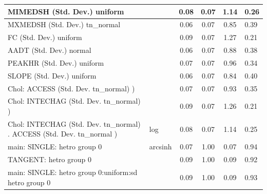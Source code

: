 \begin{table}
\begin{center}
\begin{tabular}{|l|l|c|c|c|l|}
			\hline
			MIMEDSH (Std. Dev.) uniform &  & 0.08 & 0.07 & 1.14 & 0.26 \\
			\hline
			MXMEDSH (Std. Dev.) tn_normal &  & 0.06 & 0.07 & 0.85 & 0.39 \\
			\hline
			FC (Std. Dev.) uniform &  & 0.09 & 0.07 & 1.27 & 0.21 \\
			\hline
			AADT (Std. Dev.) normal &  & 0.06 & 0.07 & 0.88 & 0.38 \\
			\hline
			PEAKHR (Std. Dev.) uniform &  & 0.07 & 0.07 & 0.96 & 0.34 \\
			\hline
			SLOPE (Std. Dev.) uniform &  & 0.06 & 0.07 & 0.84 & 0.40 \\
			\hline
			 Chol: ACCESS (Std. Dev. tn_normal) ) &  & 0.07 & 0.07 & 0.93 & 0.35 \\
			\hline
			 Chol: INTECHAG (Std. Dev. tn_normal) ) &  & 0.09 & 0.07 & 1.26 & 0.21 \\
			\hline
			 Chol: INTECHAG (Std. Dev. tn_normal) . ACCESS (Std. Dev.   tn_normal ) & log & 0.08 & 0.07 & 1.14 & 0.25 \\
			\hline
			main: SINGLE: hetro group 0 & arcsinh & 0.07 & 1.00 & 0.07 & 0.94 \\
			\hline
			TANGENT: hetro group 0 &  & 0.09 & 1.00 & 0.09 & 0.92 \\
			\hline
			main: SINGLE: hetro group 0:uniform:sd  hetro group 0 &  & 0.09 & 1.00 & 0.09 & 0.93 \\
			\hline
		\end{tabular}
	\end{center}
\end{table}